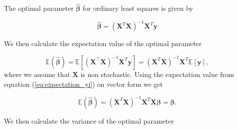 The optimal parameter $\hat{\boldsymbol{\beta}}$ for ordinary least squares is given by

$$
\hat{\boldsymbol\beta}=(\mathbf{X}^T\mathbf{X})^{-1}\mathbf{X}^T\mathbf{y}
$$


We then calculate the expectation value of the optimal parameter

$$
\mathbb{E}(\boldsymbol{\hat{\beta}}) = \mathbb{E}[ (\mathbf{X}^{\top} \mathbf{X})^{-1}\mathbf{X}^{T} \mathbf{y}]=(\mathbf{X}^{T} \mathbf{X})^{-1}\mathbf{X}^{T} \mathbb{E}[ \mathbf{y}],
$$
where we assume that $\mathbf{X}$ is non stochastic. Using the expectation value from equation (\ref{eq:expectation_yi}) on vector form we get

\begin{equation}\label{eq:expectation_beta_app}
\mathbb{E}(\boldsymbol{\hat{\beta}}) = (\mathbf{X}^{T} \mathbf{X})^{-1} \mathbf{X}^{T}\mathbf{X}\boldsymbol{\beta}=\boldsymbol{\beta}.
\end{equation}

We then calculate the variance of the optimal parameter

